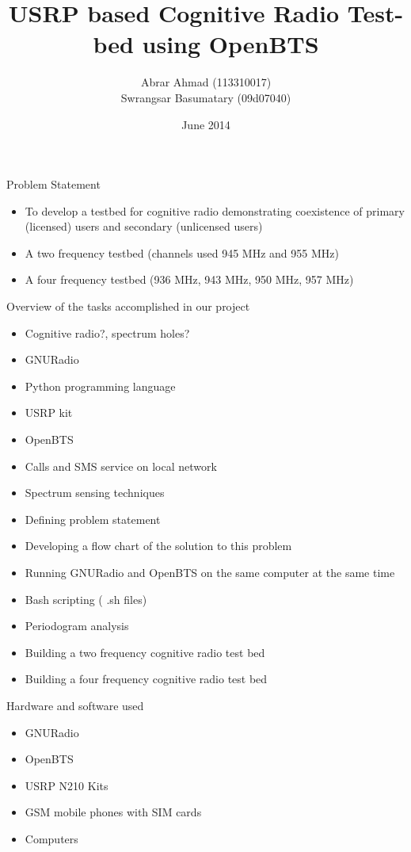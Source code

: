 \documentclass{beamer}
\title{USRP based Cognitive Radio Test-bed using OpenBTS}
\author{Abrar Ahmad (113310017) \\ Swrangsar Basumatary (09d07040) }
\institute{Department of Electrical Engineering \\ IIT Bombay, Powai}
\date{June 2014}
\begin{document}
  \frame{\titlepage}


	\begin{frame}{Problem Statement}
    	\begin{itemize}
    		\item To develop a testbed for cognitive radio demonstrating coexistence of primary (licensed) users and secondary (unlicensed users)
    		\item A two frequency testbed (channels used 945 MHz and 955 MHz)
    		\item A four frequency testbed (936 MHz, 943 MHz, 950 MHz, 957 MHz)
    	\end{itemize}
	\end{frame}
	
	\begin{frame}{Overview of the tasks accomplished in our project}
		\begin{itemize}
      \item Cognitive radio?,  spectrum holes?
      \item GNURadio
      \item Python programming language
      \item USRP kit
      \item OpenBTS
      \item Calls and SMS service on local network
      \item Spectrum sensing techniques
      \item Defining problem statement
    \end{itemize}
  \end{frame}
    
    \begin{frame}{}
        \begin{itemize}
		\item Developing a flow chart of the solution to this problem
		\item Running GNURadio and OpenBTS  on the same computer at the same time
		\item Bash scripting ( .sh files)
		\item Periodogram analysis
		\item Building a two frequency cognitive radio test bed
		\item Building a four frequency cognitive radio test bed
		\end{itemize}
	\end{frame}
	
	\begin{frame}{Hardware and software used}
    \begin{itemize}
      \item GNURadio
      \item OpenBTS
      \item USRP N210  Kits
      \item GSM mobile phones with SIM cards
      \item Computers
    \end{itemize}
  \end{frame}
\end{document}
